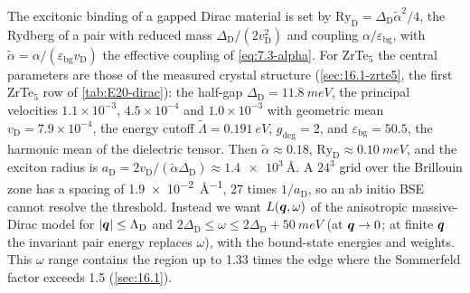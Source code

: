The excitonic binding of a gapped Dirac material is set by $\mathrm{Ry}_{\mathrm{D}} = \Delta_{\mathrm{D}}\tilde\alpha^2/4$, the Rydberg of a pair with reduced mass $\Delta_{\mathrm{D}}/(2v_{\mathrm{D}}^2)$ and coupling $\alpha/\varepsilon_{\mathrm{bg}}$, with $\tilde\alpha = \alpha/(\varepsilon_{\mathrm{bg}}v_{\mathrm{D}})$ the effective coupling of \cref{eq:7.3-alpha}. For ZrTe$_5$ the central parameters are those of the measured crystal structure (\cref{sec:16.1-zrte5}, the first ZrTe$_5$ row of \cref{tab:E20-dirac}): the half-gap $\Delta_{\mathrm{D}} = \SI{11.8}{meV}$, the principal velocities $1.1\times10^{-3}$, $4.5\times10^{-4}$ and $1.0\times10^{-3}$ with geometric mean $v_{\mathrm{D}} = 7.9\times10^{-4}$, the energy cutoff $\tilde\Lambda = \SI{0.191}{eV}$, $g_{\mathrm{deg}} = 2$, and $\varepsilon_{\mathrm{bg}} = 50.5$, the harmonic mean of the dielectric tensor. Then $\tilde\alpha \approx 0.18$, $\mathrm{Ry}_{\mathrm{D}} \approx \SI{0.10}{meV}$, and the exciton radius is $a_{\mathrm{D}} = 2v_{\mathrm{D}}/(\tilde\alpha\Delta_{\mathrm{D}}) \approx \SI{1.4e3}{\angstrom}$. A $24^3$ grid over the Brillouin zone has a spacing of \SI{1.9e-2}{\angstrom^{-1}}, 27 times $1/a_{\mathrm{D}}$, so an ab initio BSE cannot resolve the threshold. Instead we want $L(\bm{q},\omega)$ of the anisotropic massive-Dirac model for $|\bm{q}| \le \Lambda_{\mathrm{D}}$ and $2\Delta_{\mathrm{D}} \le \omega \le 2\Delta_{\mathrm{D}} + \SI{50}{meV}$ (at $\bm{q} \to 0$; at finite $\bm{q}$ the invariant pair energy replaces $\omega$), with the bound-state energies and weights. This $\omega$ range contains the region up to 1.33 times the edge where the Sommerfeld factor exceeds 1.5 (\cref{sec:16.1}).

